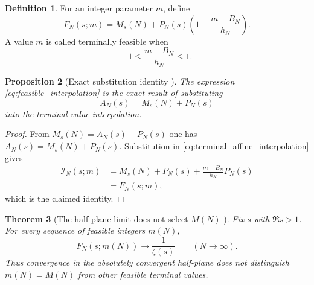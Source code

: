 \documentclass[11pt]{amsart}
\numberwithin{equation}{section}
\theoremstyle{plain}
\newtheorem{theorem}{Theorem}[section]
\newtheorem{proposition}[theorem]{Proposition}
\theoremstyle{definition}
\newtheorem{definition}[theorem]{Definition}
\theoremstyle{remark}
\newcommand{\1}{\mathbf{1}}
\begin{document}
\begin{definition}
\label{def:feasible_interpolation}
For an integer parameter \(m\), define
\begin{equation}
F_N(s;m)
=
M_s(N)
+
P_N(s)
\left(
1+\frac{m-B_N}{h_N}
\right).
\label{eq:feasible_interpolation}
\end{equation}
A value \(m\) is called terminally feasible when
\begin{equation}
-1\leq\frac{m-B_N}{h_N}\leq1.
\label{eq:feasible_interval}
\end{equation}
\end{definition}


\begin{proposition}[Exact substitution identity {}]
\label{prop:feasible_exact_identity}
The expression \eqref{eq:feasible_interpolation} is the exact result of
substituting
\begin{equation}
A_N(s)=M_s(N)+P_N(s)
\label{eq:A_M_plus_P}
\end{equation}
into the terminal-value interpolation.
\end{proposition}

\begin{proof}
From \(M_s(N)=A_N(s)-P_N(s)\) one has
\(A_N(s)=M_s(N)+P_N(s)\).  Substitution in
\eqref{eq:terminal_affine_interpolation} gives
\begin{align}
\mathcal I_N(s;m)
&=
M_s(N)+P_N(s)
+\frac{m-B_N}{h_N}P_N(s)
\label{eq:feasible_substitution_step}
\\
&=
F_N(s;m),
\label{eq:feasible_substitution_result}
\end{align}
which is the claimed identity.
\end{proof}


\begin{theorem}[The half-plane limit does not select \(M(N)\) {}]
\label{thm:halfplane_nondistinction}
Fix \(s\) with \(\Re s>1\).  For every sequence of feasible integers
\(m(N)\),
\begin{equation}
\boxed{
F_N(s;m(N))
\longrightarrow
\frac1{\zeta(s)}
\qquad
(N\to\infty).
}
\label{eq:halfplane_nondistinction}
\end{equation}
Thus convergence in the absolutely convergent half-plane does not
distinguish \(m(N)=M(N)\) from other feasible terminal values.
\end{theorem}
\end{document}
